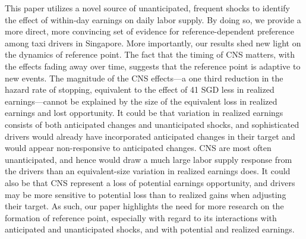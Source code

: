 \documentclass[reviewmode,AEJ]{AEA}
\begin{document}
This paper utilizes a novel source of unanticipated, frequent shocks to identify the effect of within-day 
earnings on daily labor supply. By doing so, we provide a more direct, more convincing set of evidence for 
reference-dependent preference among taxi drivers in Singapore. More importantly, our results shed new light 
on the dynamics of reference point. The fact that the timing of CNS matters, with the effects fading away
over time, suggests that the reference point is adaptive to new events. The magnitude of the CNS effects---a
one third reduction in the hazard rate of stopping, equivalent to the effect of 41 SGD less in realized 
earnings---cannot be explained by the size of the equivalent loss in realized earnings and lost opportunity.
It could be that variation 
in realized earnings consists of both anticipated changes and unanticipated shocks, and sophisticated drivers 
would already have incorporated anticipated changes in their target and would appear non-responsive to
anticipated changes. CNS are most often unanticipated, and hence would draw a much large labor supply 
response from the drivers than an equivalent-size variation in realized earnings does. It could also be
that CNS represent a loss of potential earnings opportunity, and drivers may be more sensitive to potential
loss than to realized gains when adjusting their target. As such, our paper highlights the need for more research
on the formation of reference point, especially with regard to its interactions with anticipated and
unanticipated shocks, and with potential and realized earnings.



\newpage
\end{document}
